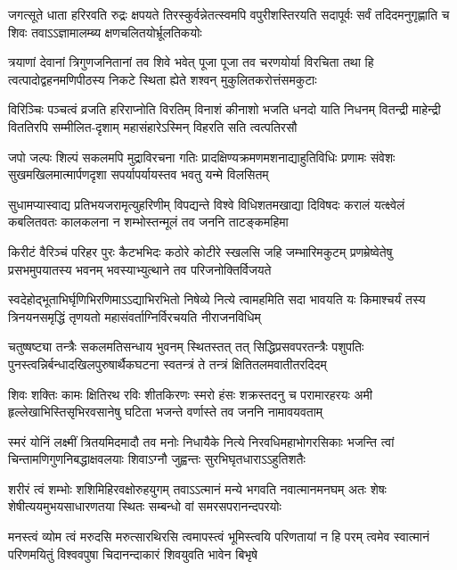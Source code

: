 \fourlineindentedshloka
{जगत्सूते धाता हरिरवति रुद्रः क्षपयते}
{तिरस्कुर्वन्नेतत्स्वमपि वपुरीशस्तिरयति}
{सदापूर्वः सर्वं तदिदमनुगृह्णाति च शिवः}
{तवाऽऽज्ञामालम्ब्य क्षणचलितयोर्भ्रूलतिकयोः}%

\fourlineindentedshloka
{त्रयाणां देवानां त्रिगुणजनितानां तव शिवे}
{भवेत् पूजा पूजा तव चरणयोर्या विरचिता}
{तथा हि त्वत्पादोद्वहनमणिपीठस्य निकटे}
{स्थिता ह्येते शश्वन् मुकुलितकरोत्तंसमकुटाः}%

\fourlineindentedshloka
{विरिञ्चिः पञ्चत्वं व्रजति हरिराप्नोति विरतिम्}
{विनाशं कीनाशो भजति धनदो याति निधनम्}
{वितन्द्री माहेन्द्री विततिरपि सम्मीलित-दृशाम्}
{महासंहारेऽस्मिन् विहरति सति त्वत्पतिरसौ}%

\fourlineindentedshloka
{जपो जल्पः शिल्पं सकलमपि मुद्राविरचना}
{गतिः प्रादक्षिण्यक्रमणमशनाद्याहुतिविधिः}
{प्रणामः संवेशः सुखमखिलमात्मार्पणदृशा}
{सपर्यापर्यायस्तव भवतु यन्मे विलसितम्}%

\fourlineindentedshloka
{सुधामप्यास्वाद्य प्रतिभयजरामृत्युहरिणीम्}
{विपद्यन्ते विश्वे विधिशतमखाद्या दिविषदः}
{करालं यत्क्ष्वेलं कबलितवतः कालकलना}
{न शम्भोस्तन्मूलं तव जननि ताटङ्कमहिमा}%

\fourlineindentedshloka
{किरीटं वैरिञ्चं परिहर पुरः कैटभभिदः}
{कठोरे कोटीरे स्खलसि जहि जम्भारिमकुटम्}
{प्रणम्रेष्वेतेषु प्रसभमुपयातस्य भवनम्}
{भवस्याभ्युत्थाने तव परिजनोक्तिर्विजयते}%

\fourlineindentedshloka
{स्वदेहोद्भूताभिर्घृणिभिरणिमाऽऽद्याभिरभितो}
{निषेव्ये नित्ये त्वामहमिति सदा भावयति यः}
{किमाश्चर्यं तस्य त्रिनयनसमृद्धिं तृणयतो}
{महासंवर्ताग्निर्विरचयति नीराजनविधिम्}%

\fourlineindentedshloka
{चतुष्षष्ट्या तन्त्रैः सकलमतिसन्धाय भुवनम्}
{स्थितस्तत् तत्  सिद्धिप्रसवपरतन्त्रैः पशुपतिः}
{पुनस्त्वन्निर्बन्धादखिलपुरुषार्थैकघटना}
{स्वतन्त्रं ते तन्त्रं क्षितितलमवातीतरदिदम्}%

\fourlineindentedshloka
{शिवः शक्तिः कामः क्षितिरथ रविः शीतकिरणः}
{स्मरो हंसः शक्रस्तदनु च परामारहरयः}
{अमी हृल्लेखाभिस्तिसृभिरवसानेषु घटिता}
{भजन्ते वर्णास्ते तव जननि नामावयवताम्}%

\fourlineindentedshloka
{स्मरं योनिं लक्ष्मीं त्रितयमिदमादौ तव मनोः}
{निधायैके नित्ये निरवधिमहाभोगरसिकाः}
{भजन्ति त्वां चिन्तामणिगुणनिबद्धाक्षवलयाः}
{शिवाऽग्नौ जुह्वन्तः सुरभिघृतधाराऽऽहुतिशतैः}%

\fourlineindentedshloka
{शरीरं त्वं शम्भोः शशिमिहिरवक्षोरुहयुगम्}
{तवाऽऽत्मानं मन्ये भगवति नवात्मानमनघम्}
{अतः शेषः शेषीत्ययमुभयसाधारणतया}
{स्थितः सम्बन्धो वां समरसपरानन्दपरयोः}%

\fourlineindentedshloka
{मनस्त्वं व्योम त्वं मरुदसि मरुत्सारथिरसि}
{त्वमापस्त्वं भूमिस्त्वयि परिणतायां न हि परम्}
{त्वमेव स्वात्मानं परिणमयितुं विश्ववपुषा}
{चिदानन्दाकारं शिवयुवति भावेन बिभृषे}%

